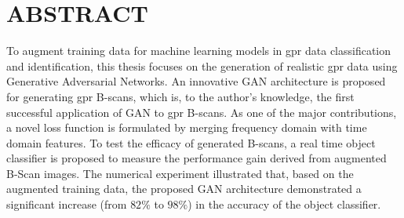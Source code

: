 \singlespacing
\chapter*{ABSTRACT}
\doublespacing

To augment training data for machine learning models in \acrfull{gpr} data classification and identification, this thesis focuses on the generation of realistic \acrshort{gpr} data using Generative Adversarial Networks. An innovative GAN architecture is proposed for generating \acrshort{gpr} B-scans, which is, to the author's knowledge, the first successful application of GAN to \acrshort{gpr} B-scans. As one of the major contributions, a novel loss function is formulated by merging frequency domain with time domain features. To test the efficacy of generated B-scans, a real time object classifier is proposed to measure the performance gain derived from augmented B-Scan images. The numerical experiment illustrated that, based on the augmented training data, the proposed GAN architecture demonstrated a significant increase (from $82\%$ to $98\%$) in the accuracy of the object classifier.